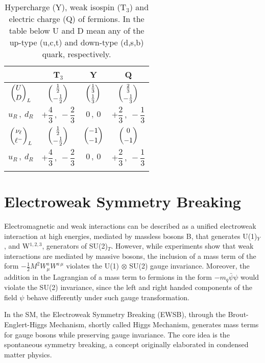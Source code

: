 \begin{table}[th]
  \centering
  \caption{Hypercharge (Y), weak isospin (T$_3$) and electric charge (Q) of fermions. In the table below U and D mean any of the up-type (u,c,t) and down-type (d,s,b) quark, respectively.}
  \label{tab:charges}
  \begin{tabular}{ c c c c }
    \toprule
    & T$_3$ & Y & Q \\
    \midrule \addlinespace
    ${\dbinom{U}{D}}_L$             & $\dbinom{\frac{1}{2}}{-\frac{1}{2}}$ & $\dbinom{\frac{1}{3}}{\frac{1}{3}}$ & $\dbinom{\frac{2}{3}}{-\frac{1}{3}}$ \\ \addlinespace
    $u_R\, ,\  d_R$                 & $+\dfrac{4}{3}\, ,\  -\dfrac{2}{3}$  & $0\, ,\ 0$                          & $+\dfrac{2}{3}\, ,\  -\dfrac{1}{3}$  \\ \addlinespace
    \hline \addlinespace
    ${\dbinom{\nu_\ell}{\ell^-}}_L$ & $\dbinom{\frac{1}{2}}{-\frac{1}{2}}$ & $\dbinom{-1}{-1}$                   & $\dbinom{0}{-1}$                     \\ \addlinespace
    $u_R\, ,\  d_R$                 & $+\dfrac{4}{3}\, ,\  -\dfrac{2}{3}$  & $0\, ,\ 0$                          & $+\dfrac{2}{3}\, ,\  -\dfrac{1}{3}$  \\ \addlinespace
    \bottomrule
  \end{tabular}
\end{table}

\section{Electroweak Symmetry Breaking}
\label{EWSB}
Electromagnetic and weak interactions can be described as a unified electroweak interaction at high energies, mediated by massless bosons B, that generates U(1)$_Y$, and W$^{1, 2, 3}$, generators of SU(2)$_T$.
However, while experiments show that weak interactions are mediated by massive bosons, the inclusion of a mass term of the form $-\frac{1}{2} M^2 W^a_\mu W^{a\, \mu}$ violates the U(1) $\otimes$ SU(2) gauge invariance.
Moreover, the addition in the Lagrangian of a mass term to fermions in the form $-m_q \bar\psi \psi$ would violate the SU(2) invariance, since the left and right handed components of the field $\psi$ behave differently under such gauge transformation.

In the SM, the Electroweak Symmetry Breaking (EWSB), through the Brout-Englert-Higgs Mechanism, shortly called Higgs Mechanism, generates mass terms for gauge bosons while preserving gauge invariance.
The core idea is the spontaneous symmetry breaking, a concept originally elaborated in condensed matter physics.

